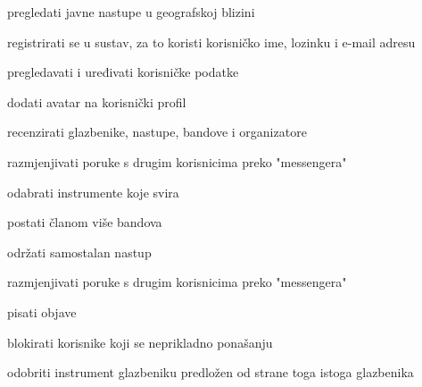 			
			\begin{packed_enum}
			
			
			\item  {}
			
			\begin{packed_enum}
				\item pregledati javne nastupe u geografskoj blizini
				\item registrirati se u sustav, za to koristi korisničko ime, lozinku i e-mail adresu
			
			\end{packed_enum}
		
		\item  {}
		
		\begin{packed_enum}
			
			\item pregledavati i uređivati korisničke podatke
			\item dodati avatar na korisnički profil
			\item recenzirati glazbenike, nastupe, bandove i organizatore
			\item razmjenjivati poruke s drugim korisnicima preko "messengera"
			
		\end{packed_enum}
	
	

\item  {}

\begin{packed_enum}
	
	\item odabrati instrumente koje svira
	\item postati članom više bandova
	\item održati samostalan nastup
	\item razmjenjivati poruke s drugim korisnicima preko "messengera"
	\item pisati objave
\end{packed_enum}

\item  {}

\begin{packed_enum}
	
	\item blokirati korisnike koji se neprikladno ponašanju
	\item odobriti instrument glazbeniku predložen od strane toga istoga glazbenika
	

\end{packed_enum}
\end{packed_enum}
